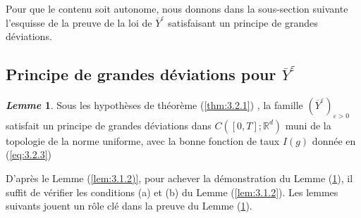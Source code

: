 \documentclass[12pt,a4paper,twoside]{report}%
\theoremstyle{definition}
\newtheorem{lem}[dfn]{\textit{Lemme}}
\numberwithin{equation}{section}
\begin{document}
	 Pour que le contenu soit autonome, nous donnons dans la sous-section suivante l'esquisse de la preuve de la loi de $\overline{Y}^\varepsilon$ satisfaisant un principe de grandes déviations.
	 \subsection{Principe de grandes déviations pour $\overline{Y}^\varepsilon$}
	 \begin{lem}\label{lem:3.2.2}
	Sous les hypothèses de théorème (\ref{thm:3.2.1}) , la famille \((\overline{Y}^\varepsilon)_{\varepsilon > 0}\) satisfait un principe de grandes déviations dans $C([0,T];\mathbb{R}^d)$ muni de la topologie de la norme uniforme, avec la bonne fonction de taux $I(g)$ donnée en (\ref{eq:3.2.3})
	\end{lem}
	
	D'après le Lemme (\ref{lem:3.1.2)}, pour achever la démonstration du Lemme (\ref{lem:3.2.2}), il suffit de vérifier les conditions (a) et (b) du Lemme (\ref{lem:3.1.2}).
	Les lemmes suivants jouent un rôle clé dans la preuve du Lemme (\ref{lem:3.2.2}).
	 
\end{document}
